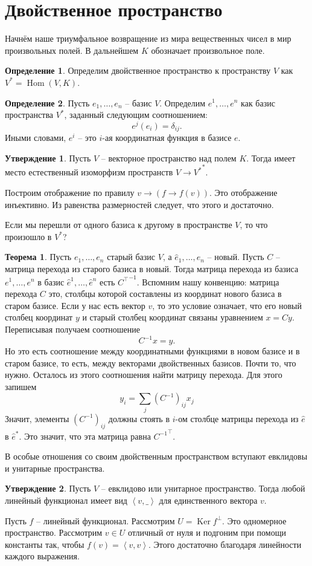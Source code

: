 \documentclass[12pt,a4paper,oneside]{book}
\theoremstyle{definition}
\newtheorem*{defn}{\color{yellow!30!red} Определение}
\newtheorem{thm}{\color{red!40!black}Теорема}
\newtheorem{utvr}{\color{blue!50!black}Утверждение}
\DeclareMathOperator{\Ker}{Ker}
\newcommand{\Hom}{\operatorname{Hom}}
\def\lan{\left\langle }
\def\ran{\right\rangle}
\def\thrm{\begin{thm}}
\def\ethrm{\end{thm}}
\def\dfn{\begin{defn}}
\def\edfn{\end{defn}}
\def\utv{\begin{utvr}}
\def\eutv{\end{utvr}}
\begin{document}
\section{Двойственное пространство}

Начнём наше триумфальное возвращение из мира вещественных чисел в мир произвольных полей. В дальнейшем $K$ обозначает произвольное поле. 

\dfn Определим двойственное пространство к пространству $V$ как $V^*=\Hom (V, K)$.
\edfn

\dfn Пусть $e_1,\dots,e_n$ -- базис $V$. Определим $e^1,\dots,e^n$ как базис пространства $V^*$, заданный следующим соотношением: 
$$e^j(e_i)=\delta_{ij}.$$
Иными словами, $e^i$ -- это $i$-ая координатная функция в базисе $e$.
\edfn

\utv Пусть $V$ -- векторное пространство над полем $K$. Тогда имеет место естественный изоморфизм пространств $V\to {V^*}^*$.
\eutv
\proof Построим отображение по правилу $v \to (f \to f(v))$. Это отображение инъективно. Из равенства размерностей следует, что этого и достаточно.
\endproof

Если мы перешли от одного базиса к другому в пространстве $V$, то что произошло в $V^*$? 

\thrm Пусть $e_1,\dots,e_n$ старый базис $V$, а $\hat{e}_1,\dots,\hat{e}_n$ -- новый. Пусть $C$ -- матрица перехода из старого базиса в новый. Тогда матрица перехода из базиса $e^1,\dots,e^n$ в базис $\hat{e}^1,\dots,\hat{e}^n$ есть ${C^{\top}}^{-1}$.
\proof Вспомним нашу конвенцию: матрица перехода $C$ это, столбцы которой составлены из координат нового базиса в старом базисе. Если у нас есть вектор $v$, то это условие означает, что его новый столбец координат $y$ и старый столбец координат связаны уравнением $x=Cy$. Переписывая получаем соотношение 
$$C^{-1}x=y.$$
Но это есть соотношение между координатными функциями в новом базисе и в старом базисе, то есть, между векторами двойственных базисов. Почти то, что нужно. Осталось из этого соотношения найти матрицу перехода. Для этого запишем $$y_i=\sum_j (C^{-1})_{ij}x_j$$
Значит, элементы $(C^{-1})_{ij}$ должны стоять в $i$-ом столбце матрицы перехода из $\hat{e}$ в $\hat{e}^*$. Это значит, что эта матрица равна ${C^{-1}}^{\top}$.
\endproof
\ethrm

В особые отношения со своим двойственным пространством вступают евклидовы и унитарные пространства. 

\utv Пусть $V$ -- евклидово или унитарное пространство. Тогда любой линейный функционал имеет вид $\lan v, \_ \ran$ для единственного вектора $v$. 
\eutv
\proof Пусть $f$ -- линейный функционал. Рассмотрим $U=\Ker f^\bot$. Это одномерное пространство. Рассмотрим $v\in U$ отличный от нуля и подгоним при помощи константы так, чтобы  $f(v)=\lan v,v \ran$. Этого достаточно благодаря линейности каждого выражения.  
\endproof
\end{document}
